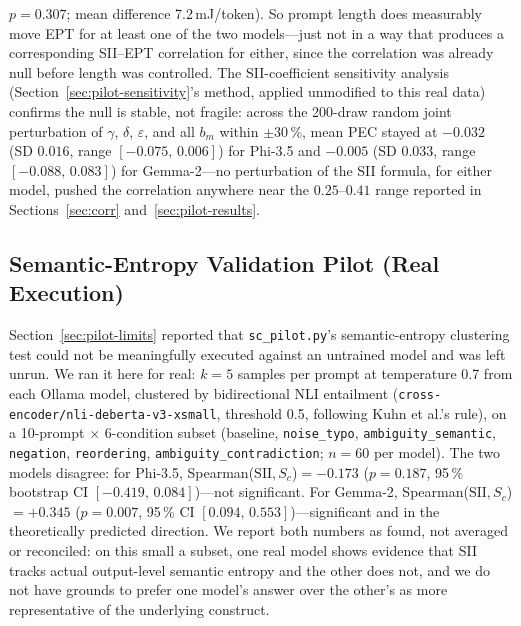 \documentclass[conference]{IEEEtran}
\begin{document}
$p=0.307$; mean difference 7.2\,mJ/token). So prompt length does
measurably move EPT for at least one of the two models---just not in
a way that produces a corresponding SII--EPT correlation for either,
since the correlation was already null before length was controlled.
The SII-coefficient sensitivity analysis (Section~\ref{sec:pilot-sensitivity}'s
method, applied unmodified to this real data) confirms the null is
stable, not fragile: across the 200-draw random joint perturbation of
$\gamma$, $\delta$, $\varepsilon$, and all $b_m$ within $\pm 30\,\%$,
mean PEC stayed at $-0.032$ (SD $0.016$, range $[-0.075,\,0.006]$) for
Phi-3.5 and $-0.005$ (SD $0.033$, range $[-0.088,\,0.083]$) for
Gemma-2---no perturbation of the SII formula, for either model, pushed
the correlation anywhere near the $0.25$--$0.41$ range reported in
Sections~\ref{sec:corr} and~\ref{sec:pilot-results}.
\subsection{Semantic-Entropy Validation Pilot (Real Execution)}
\label{sec:real-sc}
Section~\ref{sec:pilot-limits} reported that \texttt{sc\_pilot.py}'s
semantic-entropy clustering test could not be meaningfully executed
against an untrained model and was left unrun. We ran it here for
real: $k=5$ samples per prompt at temperature 0.7 from each Ollama
model, clustered by bidirectional NLI entailment
(\texttt{cross-encoder/nli-deberta-v3-xsmall}, threshold 0.5,
following Kuhn et al.'s rule), on a 10-prompt $\times$ 6-condition
subset (baseline, \texttt{noise\_typo}, \texttt{ambiguity\_semantic},
\texttt{negation}, \texttt{reordering}, \texttt{ambiguity\_contradiction};
$n=60$ per model). The two models disagree: for Phi-3.5,
Spearman($\mathrm{SII},S_c$)$=-0.173$ ($p=0.187$, 95\,\% bootstrap CI
$[-0.419,\,0.084]$)---not significant. For Gemma-2,
Spearman($\mathrm{SII},S_c$)$=+0.345$ ($p=0.007$, 95\,\% CI
$[0.094,\,0.553]$)---significant and in the theoretically predicted
direction. We report both numbers as found, not averaged or
reconciled: on this small a subset, one real model shows evidence
that SII tracks actual output-level semantic entropy and the other
does not, and we do not have grounds to prefer one model's answer
over the other's as more representative of the underlying construct.
\end{document}
